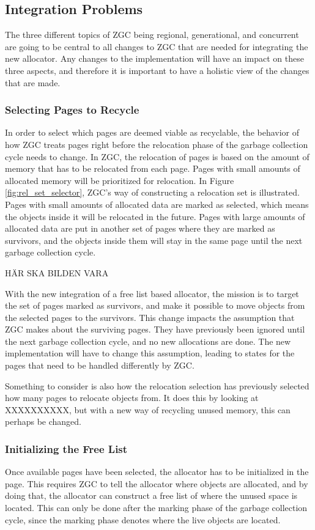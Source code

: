 \subsection{Integration Problems}
The three different topics of ZGC being regional, generational, and concurrent are going to be central to all changes to ZGC that are needed for integrating the new allocator. Any changes to the implementation will have an impact on these three aspects, and therefore it is important to have a holistic view of the changes that are made.
\subsubsection{Selecting Pages to Recycle}
In order to select which pages are deemed viable as recyclable, the behavior of how ZGC treats pages right before the relocation phase of the garbage collection cycle needs to change. In ZGC, the relocation of pages is based on the amount of memory that has to be relocated from each page. Pages with small amounts of allocated memory will be prioritized for relocation. In Figure \ref{fig:rel_set_selector}, ZGC's way of constructing a relocation set is illustrated. Pages with small amounts of allocated data are marked as selected, which means the objects inside it will be relocated in the future. Pages with large amounts of allocated data are put in another set of pages where they are marked as survivors, and the objects inside them will stay in the same page until the next garbage collection cycle. 

HÄR SKA BILDEN VARA

With the new integration of a free list based allocator, the mission is to target the set of pages marked as survivors, and make it possible to move objects from the selected pages to the survivors. This change impacts the assumption that ZGC makes about the surviving pages. They have previously been ignored until the next garbage collection cycle, and no new allocations are done. The new implementation will have to change this assumption, leading to states for the pages that need to be handled differently by ZGC.

Something to consider is also how the relocation selection has previously selected how many pages to relocate objects from. It does this by looking at XXXXXXXXXX, but with a new way of recycling unused memory, this can perhaps be changed.

\subsubsection{Initializing the Free List}
Once available pages have been selected, the allocator has to be initialized in the page. This requires ZGC to tell the allocator where objects are allocated, and by doing that, the allocator can construct a free list of where the unused space is located. This can only be done after the marking phase of the garbage collection cycle, since the marking phase denotes where the live objects are located. 


